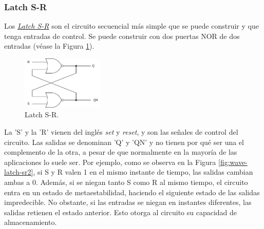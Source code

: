 \subsubsection{Latch S-R}

Los \hyperlink{sr_latch}{\emph{Latch S-R}} son el circuito secuencial más simple que se puede construir y que tenga entradas de control. Se puede construir con dos puertas NOR de dos entradas (véase la Figura \ref{fig:latch-sr}). 

\begin{figure}
    \centering
    \includegraphics[width=0.35\textwidth]{figs/latch-sr.drawio.png}
    \caption{Latch S-R.}
    \label{fig:latch-sr}
\end{figure}

La 'S' y la 'R' vienen del inglés \emph{set} y \emph{reset}, y son las señales de control del circuito. Las salidas se denominan 'Q' y 'QN' y no tienen por qué ser una el complemento de la otra, a pesar de que normalmente en la mayoría de las aplicaciones lo suele ser. Por ejemplo, como se observa en la Figura \ref{fig:wave-latch-sr2}, si S y R valen 1 en el mismo instante de tiempo, las salidas cambian ambas a 0. Además, si se niegan tanto S como R al mismo tiempo, el circuito entra en un estado de metaestabilidad, haciendo el siguiente estado de las salidas impredecible. No obstante, si las entradas se niegan en instantes diferentes, las salidas retienen el estado anterior. Esto otorga al circuito su capacidad de almacenamiento.

